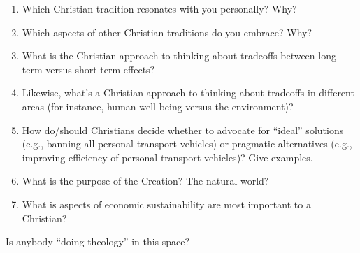 \documentclass[12pt]{article}
\begin{document}
\begin{enumerate}
  \item Which Christian tradition resonates with you personally? Why?
  
  \item Which aspects of other Christian traditions do you embrace? Why?

  \item What is the Christian approach to thinking about tradeoffs 
        between long-term versus short-term effects?
		
  \item Likewise, what's a Christian approach to thinking about tradeoffs in different areas
        (for instance, human well being versus the environment)?
		
  \item How do/should Christians decide whether to advocate for ``ideal'' solutions 
        (e.g., banning all personal transport vehicles) 
		or pragmatic alternatives
		(e.g., improving efficiency of personal transport vehicles)? 
		Give examples.

  \item What is the purpose of the Creation? The natural world?

  \item What is aspects of economic sustainability are most important to a Christian?

\end{enumerate}
%
Is anybody “doing theology” in this space?



\printbibliography
\end{document}
